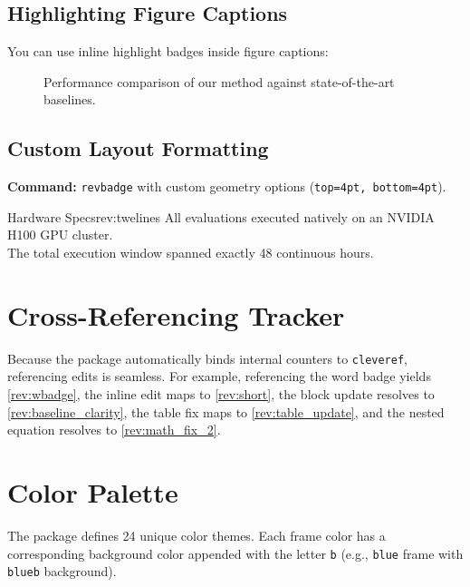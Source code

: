 \documentclass[10pt,journal,compsoc,twocolumn]{IEEEtran}
\begin{document}
\subsection{Highlighting Figure Captions}
You can use inline highlight badges inside figure captions:

\begin{figure}[htbp]
\centering
\fbox{\rule{0.6\columnwidth}{2.2cm}} %
\caption{Performance comparison of our method  against state-of-the-art baselines.}
\label{fig:performance}
\end{figure}

\subsection{Custom Layout Formatting}
\noindent
\textbf{Command:} \texttt{revbadge} with custom geometry options (\texttt{top=4pt, bottom=4pt}).

\begin{revbadge}[colframe=ylow, colback=ylowb, top=4pt, bottom=4pt]{Hardware Specs}{rev:twelines}
    All evaluations executed natively on an NVIDIA H100 GPU cluster. \\
    The total execution window spanned exactly 48 continuous hours.
\end{revbadge}

\section{Cross-Referencing Tracker}
Because the package automatically binds internal counters to \texttt{cleveref}, referencing edits is seamless. For example, referencing the word badge yields \cref{rev:wbadge}, the inline edit maps to \cref{rev:short}, the block update resolves to \cref{rev:baseline_clarity}, the table fix maps to \cref{rev:table_update}, and the nested equation resolves to \cref{rev:math_fix_2}.

\section{Color Palette}
The package defines 24 unique color themes. Each frame color has a corresponding background color appended with the letter \texttt{b} (e.g., \texttt{blue} frame with \texttt{blueb} background).
\end{document}
